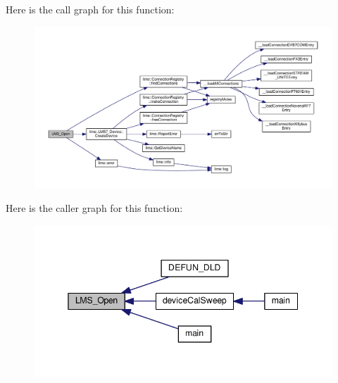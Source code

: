 Here is the call graph for this function\+:
\nopagebreak
\begin{figure}[H]
\begin{center}
\leavevmode
\includegraphics[width=350pt]{df/de1/lms7__api_8cpp_abd4183e72a6b36d5ed36b4f2fb3841aa_cgraph}
\end{center}
\end{figure}




Here is the caller graph for this function\+:
\nopagebreak
\begin{figure}[H]
\begin{center}
\leavevmode
\includegraphics[width=345pt]{df/de1/lms7__api_8cpp_abd4183e72a6b36d5ed36b4f2fb3841aa_icgraph}
\end{center}
\end{figure}


